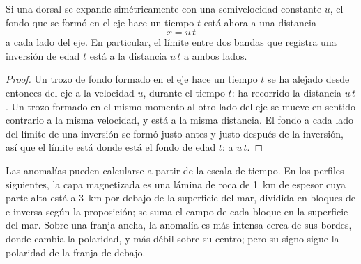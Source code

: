 \begin{proposition}\label{prop:g11:drift-to-spreading:stripe}
Si una dorsal se expande simétricamente con una semivelocidad constante $u$,
el fondo que se formó en el eje hace un tiempo $t$ está ahora a una distancia
\[
  x = u\,t
\]
a cada lado del eje. En particular, el límite entre dos bandas que registra
una inversión de edad $t$ está a la distancia $u\,t$ a ambos lados.
\end{proposition}

\begin{proof}
Un trozo de fondo formado en el eje hace un tiempo $t$ se ha alejado desde
entonces del eje a la velocidad $u$, durante el tiempo $t$: ha recorrido la
distancia $u\,t$. Un trozo formado en el mismo momento al otro lado del eje
se mueve en sentido contrario a la misma velocidad, y está a la misma
distancia. El fondo a cada lado del límite de una inversión se formó justo
antes y justo después de la inversión,
así que el límite está donde está el fondo de edad $t$: a $u\,t$.
\end{proof}

Las anomalías pueden calcularse a partir de la escala de tiempo. En los
perfiles siguientes, la capa magnetizada es una lámina de roca de \qty{1}{km}
de espesor cuya parte alta está a \qty{3}{km} por debajo de la superficie del
mar, dividida en bloques de  e inversa según la proposición;
se suma el campo de cada bloque en la superficie del mar. Sobre una franja
ancha, la anomalía es más intensa cerca de sus bordes, donde cambia la
polaridad, y más débil sobre su centro; pero su signo sigue la polaridad de
la franja de debajo.

